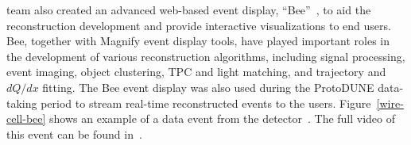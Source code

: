  team also created an advanced web-based \threed event display, ``Bee''~\cite{wire-cell-bee}, to aid the reconstruction development and provide interactive visualizations to end users.  Bee, together with \twod Magnify event 
display tools, have played important roles in 
the development of various reconstruction algorithms, including signal processing, \threed event 
imaging, object clustering, TPC and light matching, and trajectory and $dQ/dx$ fitting. The Bee event display 
was also used during the ProtoDUNE data-taking period to stream real-time reconstructed events to the users.
Figure~\ref{wire-cell-bee} shows an example of a data event from the  detector~\cite{ref:wc_bee}. 
The full video of this event can be found in~\cite{ref:bee_video}.





